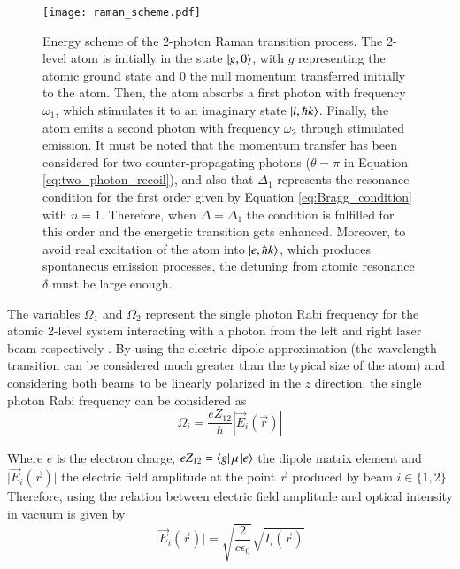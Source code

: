 \begin{figure}[!htbp]\centering
	\texttt{[image: raman\_scheme.pdf]}
	\caption[Energy scheme of the 2-photon Raman transition process]{Energy scheme of the 2-photon Raman transition process. The 2-level atom is initially in the state $\ket{g, 0}$, with $g$ representing the atomic ground state and 0 the null momentum transferred initially to the atom. Then, the atom absorbs a first photon with frequency $\omega_1$, which stimulates it to an imaginary state $\ket{i, \hbar k}$. Finally, the atom emits a second photon with frequency $\omega_2$ through stimulated emission. It must be noted that the momentum transfer has been considered for two counter-propagating photons ($\theta=\pi$ in Equation \eqref{eq:two_photon_recoil}), and also that $\Delta_1$ represents the resonance condition for the first order given by Equation \eqref{eq:Bragg_condition} with $n=1$. Therefore, when $\Delta = \Delta_1$ the condition is fulfilled for this order and the energetic transition gets enhanced. Moreover, to avoid real excitation of the atom into $\ket{e, \hbar k}$, which produces spontaneous emission processes, the detuning from atomic resonance $\delta$ must be large enough. }\label{fig:raman_scheme}
\end{figure}

The variables $\Omega_1$ and $\Omega_2$ represent the single photon Rabi frequency for the atomic 2-level system interacting with a photon from the left and right laser beam respectively \cite{Foot2005}. By using the electric dipole approximation (the wavelength transition can be considered much greater than the typical size of the atom) and considering both beams to be linearly polarized in the $z$ direction, the single photon Rabi frequency can be considered as
\begin{equation}
	\Omega_i = \frac{eZ_{12}}{\hbar} \mathopen|\vec{E}_{i}\mathclose(\vec{r})|
\end{equation} 

Where $e$ is the electron charge, $eZ_{12}=\bra{g}\mu\ket{e}$ the dipole matrix element and $\mathopen|\vec{E}_{i}(\vec{r})\mathclose|$ the electric field amplitude at the point $\vec{r}$ produced by beam $i\in \{1,2\}$. Therefore, using the relation between electric field amplitude and optical intensity in vacuum is given by
\begin{equation}
	\mathopen|\vec{E}_{i}(\vec{r})\mathclose| = \sqrt{\frac{2}{c \epsilon_0}}\sqrt{I_i(\vec{r})}
\end{equation}

